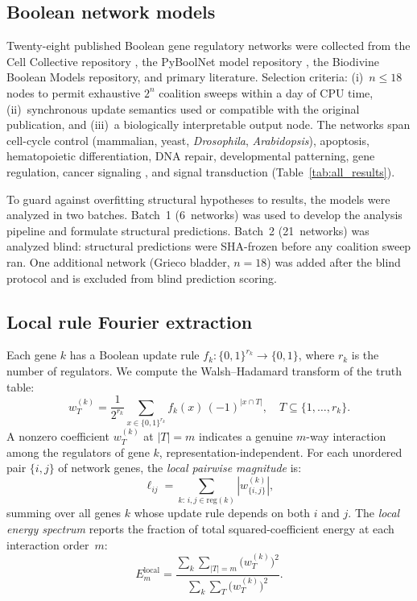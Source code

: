 \documentclass[10pt]{article}
\begin{document}
\subsection{Boolean network models}
\label{sec:models}

Twenty-eight published Boolean gene regulatory networks were collected
from the Cell Collective repository \citep{helikar2012cell}, the
PyBoolNet model repository \citep{klarner2017pyboolnet}, the Biodivine
Boolean Models repository, and primary literature. Selection criteria:
(i)~$n \leq 18$ nodes to permit exhaustive $2^n$ coalition sweeps
within a day of CPU time, (ii)~synchronous update semantics used or
compatible with the original publication, and (iii)~a biologically
interpretable output node. The networks span cell-cycle control
(mammalian, yeast, \emph{Drosophila}, \emph{Arabidopsis}), apoptosis,
hematopoietic differentiation, DNA repair, developmental patterning,
gene regulation, cancer signaling \citep{grieco2013integrative},
and signal transduction (Table~\ref{tab:all_results}).

To guard against overfitting structural hypotheses to results, the
models were analyzed in two batches. Batch~1 (6~networks) was used to
develop the analysis pipeline and formulate structural predictions.
Batch~2 (21~networks) was analyzed blind: structural predictions were
SHA-frozen before any coalition sweep ran. One additional network (Grieco bladder,
$n = 18$) was added after the blind protocol and is excluded from
blind prediction scoring.


\subsection{Local rule Fourier extraction}
\label{sec:local-fourier}

Each gene $k$ has a Boolean update rule $f_k\colon \{0,1\}^{r_k}
\to \{0,1\}$, where $r_k$ is the number of regulators. We compute
the Walsh--Hadamard transform of the truth table:
%
\begin{equation}
\label{eq:local-wht}
w_T^{(k)} = \frac{1}{2^{r_k}} \sum_{x \in \{0,1\}^{r_k}} f_k(x)\,(-1)^{|x \cap T|},
\quad T \subseteq \{1, \ldots, r_k\}.
\end{equation}
%
A nonzero coefficient $w_T^{(k)}$ at $|T| = m$ indicates a genuine
$m$-way interaction among the regulators of gene $k$,
representation-independent. For each unordered pair $\{i,j\}$ of
network genes, the \emph{local pairwise magnitude} is:
%
\begin{equation}
\label{eq:local-pair}
\ell_{ij} = \sum_{k:\, i,j \in \mathrm{reg}(k)} |w_{\{i,j\}}^{(k)}|,
\end{equation}
%
summing over all genes $k$ whose update rule depends on both $i$ and
$j$. The \emph{local energy spectrum} reports the fraction of total
squared-coefficient energy at each interaction order~$m$:
%
\begin{equation}
\label{eq:local-spectrum}
E_m^{\mathrm{local}} = \frac{\sum_k \sum_{|T|=m} \bigl(w_T^{(k)}\bigr)^2}
{\sum_k \sum_T \bigl(w_T^{(k)}\bigr)^2}.
\end{equation}
\end{document}
